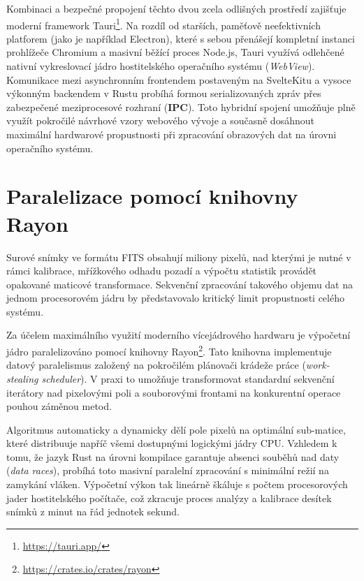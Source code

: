 Kombinaci a bezpečné propojení těchto dvou zcela odlišných prostředí zajišťuje moderní framework Tauri\footnote{\url{https://tauri.app/}}. Na rozdíl od starších, paměťově neefektivních platforem (jako je například Electron), které s sebou přenášejí kompletní instanci prohlížeče Chromium a masivní běžící proces Node.js, Tauri využívá odlehčené nativní vykreslovací jádro hostitelského operačního systému (\textit{WebView}). Komunikace mezi asynchronním frontendem postaveným na SvelteKitu a vysoce výkonným backendem v Rustu probíhá formou serializovaných zpráv přes zabezpečené meziprocesové rozhraní (\textbf{\ac{IPC}}). Toto hybridní spojení umožňuje plně využít pokročilé návrhové vzory webového vývoje a současně dosáhnout maximální hardwarové propustnosti při zpracování obrazových dat na úrovni operačního systému.

\section{Paralelizace pomocí knihovny Rayon}
Surové snímky ve formátu \ac{FITS} obsahují miliony pixelů, nad kterými je nutné v rámci kalibrace, mřížkového odhadu pozadí a výpočtu statistik provádět opakované maticové transformace. Sekvenční zpracování takového objemu dat na jednom procesorovém jádru by představovalo kritický limit propustnosti celého systému.

Za účelem maximálního využití moderního vícejádrového hardwaru je výpočetní jádro paralelizováno pomocí knihovny Rayon\footnote{\url{https://crates.io/crates/rayon}}. Tato knihovna implementuje datový paralelismus založený na pokročilém plánovači krádeže práce (\textit{work-stealing scheduler}). V praxi to umožňuje transformovat standardní sekvenční iterátory nad pixelovými poli a souborovými frontami na konkurentní operace pouhou záměnou metod. 

Algoritmus automaticky a dynamicky dělí pole pixelů na optimální sub-matice, které distribuuje napříč všemi dostupnými logickými jádry CPU. Vzhledem k tomu, že jazyk Rust na úrovni kompilace garantuje absenci souběhů nad daty (\textit{data races}), probíhá toto masivní paralelní zpracování s minimální režií na zamykání vláken. Výpočetní výkon tak lineárně škáluje s počtem procesorových jader hostitelského počítače, což zkracuje proces analýzy a kalibrace desítek snímků z minut na řád jednotek sekund.